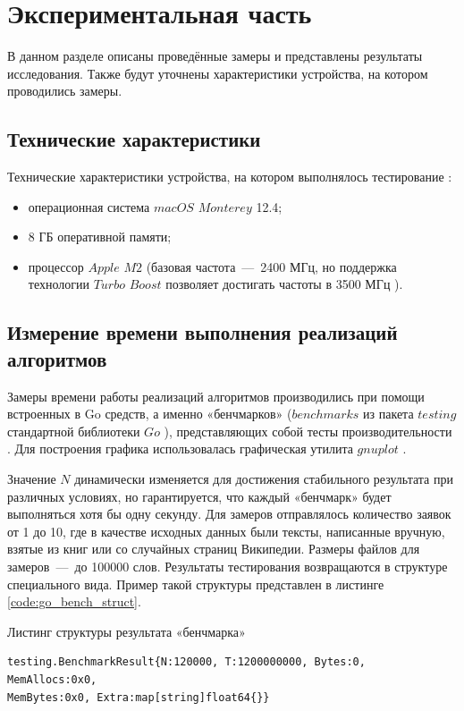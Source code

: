 \chapter{Экспериментальная часть}

В данном разделе описаны проведённые замеры и представлены результаты исследования. Также будут уточнены характеристики устройства, на котором проводились замеры.

\section{Технические характеристики}
Технические характеристики устройства, на котором выполнялось тестирование \cite{web_item5}:
\begin{itemize}
	\item операционная система $macOS$ $Monterey$ 12.4;
	\item 8 ГБ оперативной памяти;
	\item процессор $Apple$ $M2$ (базовая частота~---~2400 МГц, но поддержка технологии $Turbo$ $Boost$ позволяет достигать частоты в 3500 МГц \cite{web_item10}).
\end{itemize}

\section{Измерение времени выполнения реализаций алгоритмов}
Замеры времени работы реализаций алгоритмов производились при помощи встроенных в Go средств, а именно «бенчмарков» ($benchmarks$ из пакета $testing$ стандартной библиотеки $Go$ \cite{web_item2}), представляющих собой тесты производительности \cite{web_item18}. Для построения графика использовалась графическая утилита $gnuplot$ \cite{web_item17}.

Значение $N$ динамически изменяется для достижения стабильного результата при различных условиях, но гарантируется, что каждый «бенчмарк» будет выполняться хотя бы одну секунду. Для замеров отправлялось количество заявок от 1 до 10, где в качестве исходных данных были тексты, написанные вручную, взятые из книг или со случайных страниц Википедии. Размеры файлов для замеров~---~до 100000 слов. Результаты тестирования возвращаются в структуре специального вида. Пример такой структуры представлен в листинге \ref{code:go_bench_struct}.

\begin{code}
\caption{Листинг структуры результата «бенчмарка»}
\label{code:go_bench_struct}

\begin{verbatim}
testing.BenchmarkResult{N:120000, T:1200000000, Bytes:0, MemAllocs:0x0, 
MemBytes:0x0, Extra:map[string]float64{}}
\end{verbatim}
\end{code}

